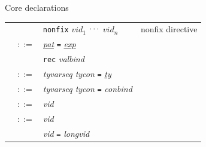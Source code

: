 \begin{grammar}{Core declarations}
\begin{longtable}{rcll}
&\alt&\texttt{nonfix} \optional{\textit{d}} $vid_{1}$ $\mathinner{{}^{\textstyle .\,.\,.}}$ $vid_{n}$
&nonfix directive\\
\label{grammar:valbind}\nonterminal{valbind} & $::=$ & \hyperref[grammar:pat]{\textit{pat}}
\texttt{=} \hyperref[grammar:exp]{\textit{exp}} \optional{\texttt{and} \textit{valbind}}\\
&\alt&\texttt{rec} \textit{valbind}\\
\label{grammar:typbind}\nonterminal{typbind} & $::=$ &
\textit{tyvarseq tycon} \texttt{=} \hyperref[grammar:ty]{\textit{ty}} \optional{\texttt{and} \textit{typbind}}\\
\label{grammar:datbind}\nonterminal{datbind} & $::=$ &
\textit{tyvarseq tycon} \texttt{=} \textit{conbind} \optional{\texttt{and} \textit{datbind}}\\
\label{grammar:conbind}\nonterminal{conbind} & $::=$ &
\optional{\texttt{op}}\textit{vid} \optional{\texttt{of} \hyperref[grammar:ty]{\textit{ty}}} \optional{\texttt{\char`\|} \textit{datbind}}\\
\label{grammar:exbind}\nonterminal{exbind} & $::=$ &
\optional{\texttt{op}}\textit{vid} \optional{\texttt{of} \hyperref[grammar:ty]{\textit{ty}}} \optional{\texttt{and} \textit{exbind}}\\ 
&\alt&\optional{\texttt{op}}\textit{vid} \texttt{=} \optional{\texttt{op}} \textit{longvid} \optional{\texttt{and} \textit{exbind}}\\ 
\end{longtable}
\end{grammar}

